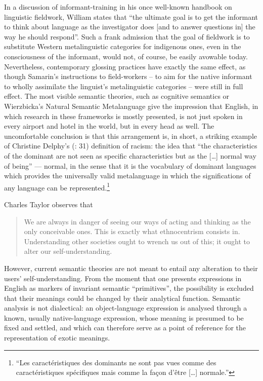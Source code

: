 \documentclass[output=paper]{langscibook}
\begin{document}
In a discussion of informant-training in his once well-known \citeyear{Samarin1967} handbook on linguistic fieldwork, William \citet[41]{Samarin1967} states that ``the ultimate goal is to get the informant to think about language as the investigator does [and to answer questions in] the way he should respond''. Such a frank admission that the goal of fieldwork is to substitute Western metalinguistic categories for indigenous ones, even in the consciousness of the informant, would not, of course, be easily avowable today. Nevertheless, contemporary glossing practices have exactly the same effect, as though Samarin's instructions to field-workers – to aim for the native informant to wholly assimilate the linguist's metalinguistic categories – were still in full effect. The most visible semantic theories, such as cognitive semantics or Wierzbicka's Natural Semantic Metalanguage \citep[see][]{Wierzbicka1996} give the impression that English, in which research in these frameworks is mostly presented, is not just spoken in every airport and hotel in the world, but in every head as well. The uncomfortable conclusion is that this arrangement is, in short, a striking example of Christine Delphy's (\citeyear{Delphy2008}: 31) definition of racism: the idea that ``the characteristics of the dominant are not seen as specific characteristics but as the […] normal way of being''  — normal, in the sense that it is the vocabulary of dominant languages which provides the universally valid metalanguage in which the significations of any language can be represented.\footnote{``Les caractéristiques des dominants ne sont pas vues comme des caractéristiques spécifiques mais comme la façon d'être […] normale.''}

Charles Taylor observes that

\begin{quotation}
We are always in danger of seeing our ways of acting and thinking as the only conceivable ones. This is exactly what ethnocentrism consists in. Understanding other societies ought to wrench us out of this; it ought to alter our self-understanding. \citep[129]{Taylor1985}
\end{quotation}

However, current semantic theories are not meant to entail any alteration to their users' self-understanding.  From the moment that one presents expressions in English as markers of invariant semantic ``primitives'', the possibility is excluded that their meanings could be changed by their analytical function. Semantic analysis is not dialectical: an object-language expression is analysed through a known, usually native-language expression, whose meaning is presumed to be fixed and settled, and which can therefore serve as a point of reference for the representation of exotic meanings.
\end{document}
